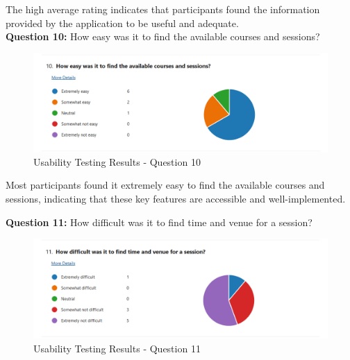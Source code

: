 \begin{justify}
\vspace{-0.25cm}
\newendline The high average rating indicates that participants found the information provided by the application to be useful and adequate.\\


\vspace{0.25cm}
\newendline \textbf{Question 10:} How easy was it to find the available courses and sessions?

\begin{figure}[H]
    \centerline{\includegraphics[width=150mm,scale=1]{figures/implementation_and_testing/testing/MUT/answers/Answers (10).png}}
    \caption{Usability Testing Results - Question 10}
    \label{Usability Testing Results - Question 10}
\end{figure}

\vspace{0.25cm}
\newendline Most participants found it extremely easy to find the available courses and sessions, indicating that these key features are accessible and well-implemented.

\vspace{0.25cm}
\newendline \textbf{Question 11:} How difficult was it to find time and venue for a session?

\begin{figure}[H]
    \centerline{\includegraphics[width=150mm,scale=1]{figures/implementation_and_testing/testing/MUT/answers/Answers (11).png}}
    \caption{Usability Testing Results - Question 11}
    \label{Usability Testing Results - Question 11}
\end{figure}


\end{justify}
